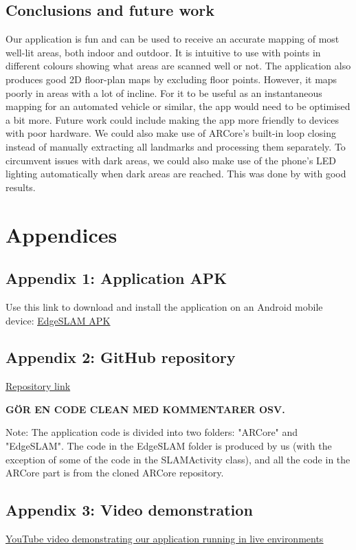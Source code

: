 \documentclass{article}
\begin{document}
\subsection{Conclusions and future work}
Our application is fun and can be used to receive an accurate mapping of most well-lit areas, both indoor and outdoor. It is intuitive to use with points in different colours showing what areas are scanned well or not. The application also produces good 2D floor-plan maps by excluding floor points. However, it maps poorly in areas with a lot of incline. For it to be useful as an instantaneous mapping for an automated vehicle or similar, the app would need to be optimised a bit more. Future work could include making the app more friendly to devices with poor hardware. We could also make use of ARCore's built-in loop closing instead of manually extracting all landmarks and processing them separately. To circumvent issues with dark areas, we could also make use of the phone's LED lighting automatically when dark areas are reached. This was done by \cite{dark} with good results.

\newpage
  


\section*{Appendices}

\subsection*{Appendix 1: Application APK}

Use this link to download and install the application on an Android mobile device: \underline{\href{https://gofile.io/d/qrnUMs}{EdgeSLAM APK}}

\subsection*{Appendix 2: GitHub repository}

\underline{\href{https://github.com/jonatan-flyckt/edge-project}{Repository link}}

\textbf{GÖR EN CODE CLEAN MED KOMMENTARER OSV.}

Note: The application code is divided into two folders: "ARCore" and "EdgeSLAM". The code in the EdgeSLAM folder is produced by us (with the exception of some of the code in the SLAMActivity class), and all the code in the ARCore part is from the cloned ARCore repository.

\subsection*{Appendix 3: Video demonstration}
\underline{\href{https://www.youtube.com/watch?v=DzVZ3-SN9z8&feature=youtu.be&fbclid=IwAR3qJmJFWr76Q3OxECmys8Ir4qt6TEGevo86pbrAXv_0whPho_CLZh_HW-M}{YouTube video demonstrating our application running in live environments}}
\end{document}
